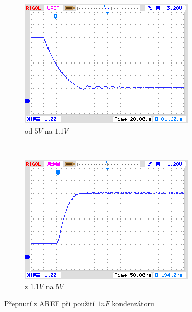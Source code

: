 \begin{figure}[H]
  \begin{subfigure}[b]{.5\textwidth}
    \centering
    \includegraphics[width=.95\textwidth]{../PNG/AREF2_1V.png}
    \caption{od \(5V\) na \(1.1V\) }
    \label{pic:aref1}
  \end{subfigure}
  ~
  \begin{subfigure}[b]{.5\textwidth}
    \centering
    \includegraphics[width=.95\textwidth]{../PNG/AREF2VCC.png}
    \caption{z \(1.1V\) na \(5V\)}
    \label{pic:aref5}
  \end{subfigure}
  \caption{Přepnutí z AREF při použití \(1nF\) kondenzátoru}
\end{figure}

